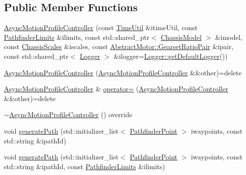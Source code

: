 \subsection*{Public Member Functions}
\begin{DoxyCompactItemize}
\item 
\mbox{\hyperlink{classokapi_1_1AsyncMotionProfileController_a7552d4d18213b79ec0fc0e65a3294305}{Async\+Motion\+Profile\+Controller}} (const \mbox{\hyperlink{classokapi_1_1TimeUtil}{Time\+Util}} \&itime\+Util, const \mbox{\hyperlink{structokapi_1_1PathfinderLimits}{Pathfinder\+Limits}} \&ilimits, const std\+::shared\+\_\+ptr$<$ \mbox{\hyperlink{classokapi_1_1ChassisModel}{Chassis\+Model}} $>$ \&imodel, const \mbox{\hyperlink{classokapi_1_1ChassisScales}{Chassis\+Scales}} \&iscales, const \mbox{\hyperlink{structokapi_1_1AbstractMotor_1_1GearsetRatioPair}{Abstract\+Motor\+::\+Gearset\+Ratio\+Pair}} \&ipair, const std\+::shared\+\_\+ptr$<$ \mbox{\hyperlink{classokapi_1_1Logger}{Logger}} $>$ \&ilogger=\mbox{\hyperlink{classokapi_1_1Logger_a5053cf778b4b55acba788a3797dc96d2}{Logger\+::get\+Default\+Logger}}())
\item 
\mbox{\hyperlink{classokapi_1_1AsyncMotionProfileController_ad5c9863c0a6be7c6b333703d8e778399}{Async\+Motion\+Profile\+Controller}} (\mbox{\hyperlink{classokapi_1_1AsyncMotionProfileController}{Async\+Motion\+Profile\+Controller}} \&\&other)=delete
\item 
\mbox{\hyperlink{classokapi_1_1AsyncMotionProfileController}{Async\+Motion\+Profile\+Controller}} \& \mbox{\hyperlink{classokapi_1_1AsyncMotionProfileController_adb67189604f463a2cdc719a59baa128c}{operator=}} (\mbox{\hyperlink{classokapi_1_1AsyncMotionProfileController}{Async\+Motion\+Profile\+Controller}} \&\&other)=delete
\item 
\mbox{\hyperlink{classokapi_1_1AsyncMotionProfileController_ad39490ab331f47d969eb484c4d5c63e1}{$\sim$\+Async\+Motion\+Profile\+Controller}} () override
\item 
void \mbox{\hyperlink{classokapi_1_1AsyncMotionProfileController_a3b8ba2a691bea6f1cf7596f0ecb8b899}{generate\+Path}} (std\+::initializer\+\_\+list$<$ \mbox{\hyperlink{structokapi_1_1PathfinderPoint}{Pathfinder\+Point}} $>$ iwaypoints, const std\+::string \&ipath\+Id)
\item 
void \mbox{\hyperlink{classokapi_1_1AsyncMotionProfileController_a4b01625204f9949abd00e54513e3b1fa}{generate\+Path}} (std\+::initializer\+\_\+list$<$ \mbox{\hyperlink{structokapi_1_1PathfinderPoint}{Pathfinder\+Point}} $>$ iwaypoints, const std\+::string \&ipath\+Id, const \mbox{\hyperlink{structokapi_1_1PathfinderLimits}{Pathfinder\+Limits}} \&ilimits)

\end{DoxyCompactItemize}
